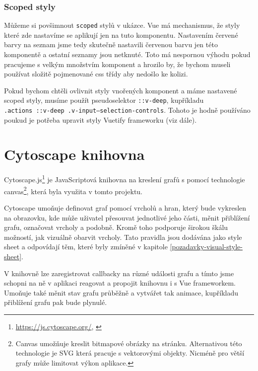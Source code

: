 \subsubsection*{Scoped styly}

Můžeme si povšimnout \texttt{scoped} stylů v ukázce. Vue má mechanismus, že styly které zde nastavíme se aplikují jen na tuto komponentu. Nastavením červené barvy na seznam jsme tedy skutečně nastavili červenou barvu jen této komponentě a ostatní seznamy jsou netknuté. Toto má nespornou výhodu pokud pracujeme s velkým množstvím komponent a hrozilo by, že bychom museli používat složitě pojmenované css třídy aby nedošlo ke kolizi.

Pokud bychom chtěli ovlivnit styly vnořených komponent a máme nastavené scoped styly, musíme použít pseudoselektor \texttt{::v-deep}, kupříkladu \\  \texttt{.actions ::v-deep .v-input--selection-controls}. Tohoto je hodně používáno poukud je potřeba upravit styly Vuetify frameworku (viz dále).

\newpage






\section{Cytoscape knihovna}

Cytoscape.js\footnote{\url{https://js.cytoscape.org/}, \citet{10.1093/bioinformatics/btv557}} je JavaScriptová knihovna na kreslení grafů s pomocí technologie canvas\footnote{Canvas umožňuje kreslit bitmapové obrázky na stránku. Alternativou této technologie je SVG která pracuje s vektorovými objekty. Nicméně pro větší grafy může limitovat výkon aplikace.}, která byla využita v tomto projektu.

Cytoscape umoňuje definovat graf pomocí vrcholů a hran, který bude vykreslen na obrazovku, kde může uživatel přesouvat jednotlivé jeho části, měnit přiblížení grafu, označovat vrcholy a podobně. Kromě toho podporuje širokou škálu možností, jak vizuálně obarvit vrcholy. Tato pravidla jsou dodávána jako style sheet a odpovídají těm, které byly zmíněné v kapitole \ref{pozadavky-visual-style-sheet}.

V knihovně lze zaregistrovat callbacky na různé události grafu a tímto jsme schopni na ně v aplikaci reagovat a propojit knihovnu i s Vue frameworkem. Umoňuje také měnit stav grafu průběžně a vytvářet tak animace, kupříkladu přiblížení grafu pak bude plynulé.

